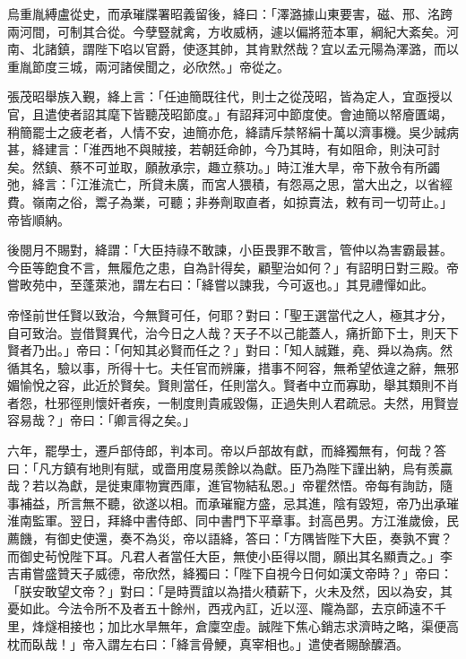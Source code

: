 \begin{pinyinscope}
 烏重胤縛盧從史，而承璀牒署昭義留後，絳曰：「澤潞據山東要害，磁、邢、洺跨兩河間，可制其合從。今孽豎就禽，方收威柄，遽以偏將蒞本軍，綱紀大紊矣。河南、北諸鎮，謂陛下啗以官爵，使逐其帥，其肯默然哉？宜以孟元陽為澤潞，而以重胤節度三城，兩河諸侯聞之，必欣然。」帝從之。



 張茂昭舉族入覲，絳上言：「任迪簡既往代，則士之從茂昭，皆為定人，宜亟授以官，且遣使者詔其麾下皆聽茂昭節度。」有詔拜河中節度使。會迪簡以帑廥匱竭，稍簡罷士之疲老者，人情不安，迪簡亦危，絳請斥禁帑絹十萬以濟事機。吳少誠病甚，絳建言：「淮西地不與賊接，若朝廷命帥，今乃其時，有如阻命，則決可討矣。然鎮、蔡不可並取，願赦承宗，趣立蔡功。」時江淮大旱，帝下赦令有所蠲弛，絳言：「江淮流亡，所貸未廣，而宮人猥積，有怨鬲之思，當大出之，以省經費。嶺南之俗，鬻子為業，可聽；非券劑取直者，如掠賣法，敕有司一切苛止。」帝皆順納。



 後閱月不賜對，絳謂：「大臣持祿不敢諫，小臣畏罪不敢言，管仲以為害霸最甚。今臣等飽食不言，無履危之患，自為計得矣，顧聖治如何？」有詔明日對三殿。帝嘗畋苑中，至蓬萊池，謂左右曰：「絳嘗以諫我，今可返也。」其見禮憚如此。



 帝怪前世任賢以致治，今無賢可任，何耶？對曰：「聖王選當代之人，極其才分，自可致治。豈借賢異代，治今日之人哉？天子不以己能蓋人，痛折節下士，則天下賢者乃出。」帝曰：「何知其必賢而任之？」對曰：「知人誠難，堯、舜以為病。然循其名，驗以事，所得十七。夫任官而辨廉，措事不阿容，無希望依違之辭，無邪媚愉悅之容，此近於賢矣。賢則當任，任則當久。賢者中立而寡助，舉其類則不肖者怨，杜邪徑則懷奸者疾，一制度則貴戚毀傷，正過失則人君疏忌。夫然，用賢豈容易哉？」帝曰：「卿言得之矣。」



 六年，罷學士，遷戶部侍郎，判本司。帝以戶部故有獻，而絳獨無有，何哉？答曰：「凡方鎮有地則有賦，或嗇用度易羨餘以為獻。臣乃為陛下謹出納，烏有羨贏哉？若以為獻，是徙東庫物實西庫，進官物結私恩。」帝瞿然悟。帝每有詢訪，隨事補益，所言無不聽，欲遂以相。而承璀寵方盛，忌其進，陰有毀短，帝乃出承璀淮南監軍。翌日，拜絳中書侍郎、同中書門下平章事。封高邑男。方江淮歲儉，民薦饑，有御史使還，奏不為災，帝以語絳，答曰：「方隅皆陛下大臣，奏孰不實？而御史茍悅陛下耳。凡君人者當任大臣，無使小臣得以間，願出其名顯責之。」李吉甫嘗盛贊天子威德，帝欣然，絳獨曰：「陛下自視今日何如漢文帝時？」帝曰：「朕安敢望文帝？」對曰：「是時賈誼以為措火積薪下，火未及然，因以為安，其憂如此。今法令所不及者五十餘州，西戎內訌，近以涇、隴為鄙，去京師遠不千里，烽燧相接也；加比水旱無年，倉廩空虛。誠陛下焦心銷志求濟時之略，渠便高枕而臥哉！」帝入謂左右曰：「絳言骨鯁，真宰相也。」遣使者賜酴醾酒。




\end{pinyinscope}

